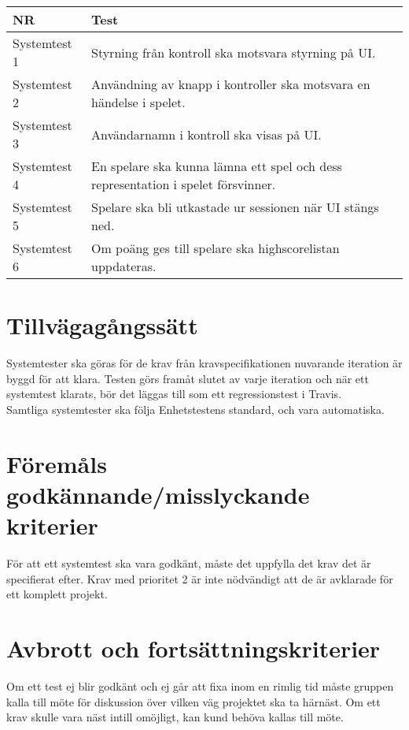   \noindent
	\begin{tabular}{| p{2.1cm}| p{8cm}|}

      \hline
      NR&Test\\
      \hline

		Systemtest 1&Styrning från kontroll ska motsvara styrning på UI.\\
		\hline
		Systemtest 2&Användning av knapp i kontroller ska motsvara en händelse i spelet.\\
		\hline
		Systemtest 3&Användarnamn i kontroll ska visas på UI.\\
		\hline
		Systemtest 4&En spelare ska kunna lämna ett spel och dess representation i spelet försvinner.\\
		\hline
		Systemtest 5&Spelare ska bli utkastade ur sessionen när UI stängs ned.\\
		\hline
		Systemtest 6&Om poäng ges till spelare ska highscorelistan uppdateras.\\
		\hline




  \end{tabular}




\section{Tillvägagångssätt}
	Systemtester ska göras för de krav från kravspecifikationen nuvarande iteration är byggd för att klara. Testen görs framåt slutet av varje iteration och när ett systemtest klarats, bör det läggas till som ett regressionstest i Travis.\\

	Samtliga systemtester ska följa Enhetstestens standard, och vara automatiska.




\section{Föremåls godkännande/misslyckande kriterier}
	För att ett systemtest ska vara godkänt, måste det uppfylla det krav det är specifierat efter. Krav med prioritet 2 är inte nödvändigt att de är avklarade för ett komplett projekt.\\


\section{Avbrott och fortsättningskriterier}
	Om ett test ej blir godkänt och ej går att fixa inom en rimlig tid måste gruppen kalla till möte för diskussion över vilken väg projektet ska ta härnäst. Om ett krav skulle vara näst intill omöjligt, kan kund behöva kallas till möte.




